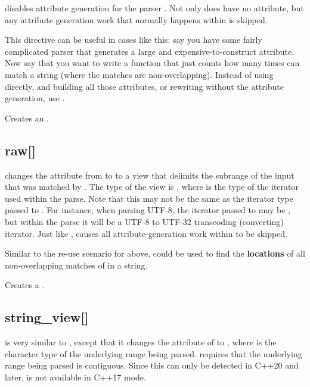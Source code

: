 \documentclass{MyBook}
\begin{document}
 disables attribute generation for the parser . Not only does  have no attribute, but any attribute generation work that normally happens within  is skipped.

This directive can be useful in cases like this: say you have some fairly complicated parser  that generates a large and expensive-to-construct attribute. Now say that you want to write a function that just counts how many times  can match a string (where the matches are non-overlapping). Instead of using  directly, and building all those attributes, or rewriting  without the attribute generation, use .

Creates an .

\subsection{raw{[}{]}}

 changes the attribute from \emph{} to to a view that delimits the subrange of the input that was matched by . The type of the view is , where  is the type of the iterator used within the parse. Note that this may not be the same as the iterator type passed to . For instance, when parsing UTF-8, the iterator passed to  may be , but within the parse it will be a UTF-8 to UTF-32 transcoding (converting) iterator. Just like ,  causes all attribute-generation work within  to be skipped.

Similar to the re-use scenario for  above,  could be used to find the \textbf{locations} of all non-overlapping matches of  in a string.

Creates a .

\subsection{string\_view{[}{]}}

 is very similar to , except that it changes the attribute of  to , where  is the character type of the underlying range being parsed.  requires that the underlying range being parsed is contiguous. Since this can only be detected in C++20 and later,  is not available in C++17 mode.
\end{document}
